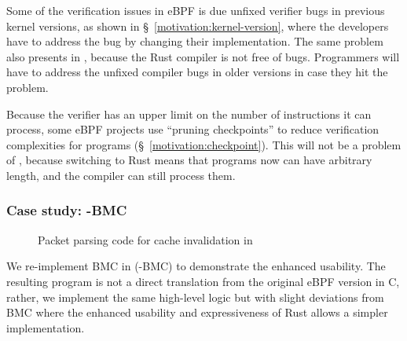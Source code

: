 Some of the verification issues in eBPF is due unfixed verifier bugs in
    previous kernel versions, as shown in \S~\ref{motivation:kernel-version},
    where the developers have to address the bug by changing their
    implementation.
The same problem also presents in \projname{}, because the Rust compiler is not
    free of bugs.
Programmers will have to address the unfixed compiler bugs in older versions
    in case they hit the problem.

Because the verifier has an upper limit on the number of instructions it can
    process, some eBPF projects use ``pruning checkpoints'' to reduce
    verification complexities for programs (\S~\ref{motivation:checkpoint}).
This will not be a problem of \projname{}, because switching to Rust means that
    programs now can have arbitrary length, and the compiler can still process
    them.

\subsubsection{Case study: \projname{}-BMC}
\label{eval:bmc-case-study}

\begin{figure}[t]
    
    \vspace{-10pt}
    \caption{Packet parsing code for cache invalidation in \projname{}}
    \vspace{-10pt}
    \label{fig:rust-code}
\end{figure}




We re-implement BMC\cite{BMC} in \projname{} (\projname{}-BMC) to demonstrate the
    enhanced usability.
The resulting program is not a direct translation from the original eBPF
    version in C, rather, we implement the same high-level logic but with
    slight deviations from BMC where the enhanced usability and expressiveness
    of Rust allows a simpler implementation.

